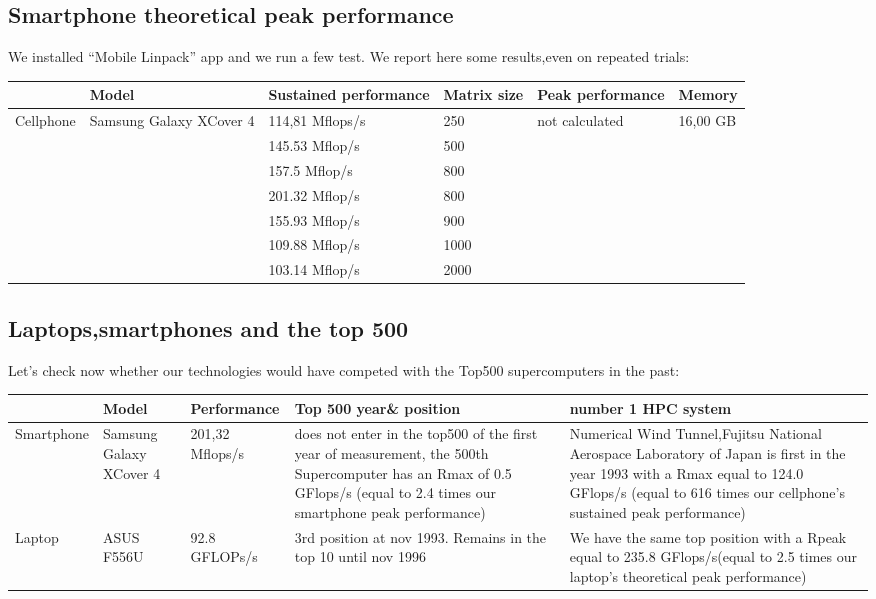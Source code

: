 \documentclass[11pt]{scrartcl} %
\begin{document}
\subsection{Smartphone theoretical peak performance}
We installed "`Mobile Linpack"' app and we run a few test. We report here some results,even on repeated trials: 
\begin{adjustwidth}{-2cm}{}
	\begin{tabular}[H]{l| p{}| l |l| l|l }
		\hline
			&Model& Sustained performance&Matrix size&Peak performance&Memory\\
			\hline
			Cellphone&Samsung Galaxy XCover 4 &114,81 Mflops/s &250 &not calculated&16,00 GB\\
			& &145.53 Mflop/s&500& &\\
			& &157.5 Mflop/s&800& &\\
			& &201.32 Mflop/s&800& &\\
			& &155.93 Mflop/s&900& &\\
			& &109.88 Mflop/s&1000& &\\
			& &103.14 Mflop/s&2000& &\\
		\end{tabular}
\end{adjustwidth}

\subsection{Laptops,smartphones and the top 500}
Let's check now whether our technologies would have competed with the Top500 supercomputers in the past:
\begin{adjustwidth}{-2cm}{}
	\begin{tabular}[H]{p{}| p{}| p{} | p{}| p{}}
		\hline
			&Model&Performance&Top 500 year\& position&number 1 HPC system\\
			\hline
			Smartphone&Samsung Galaxy XCover 4 &201,32 Mflops/s &does not enter in the top500 of the first year of measurement, the 500th Supercomputer has an Rmax of 0.5 GFlops/s (equal to 2.4 times our smartphone peak performance)& Numerical Wind Tunnel,Fujitsu National Aerospace Laboratory of Japan is first in the year 1993 with a Rmax equal to 124.0 GFlops/s (equal to 616 times our cellphone's sustained peak performance)\\
			\hline
			Laptop&ASUS F556U&92.8 GFLOPs/s& 3rd position at nov 1993. Remains in the top 10 until nov 1996 & We have the same top position with a Rpeak equal to 235.8 GFlops/s(equal to 2.5 times our laptop's theoretical peak performance)\\
		\end{tabular}
\end{adjustwidth}
\end{document}
